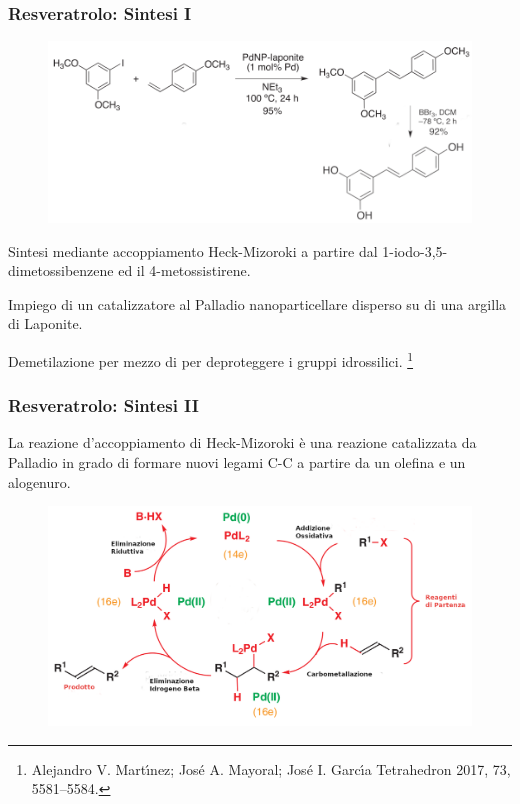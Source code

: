 \documentclass[9pt]{beamer}
\newcommand\blfootnote[1]{%
	\begingroup
	\renewcommand\thefootnote{}\footnote{#1}%
	\addtocounter{footnote}{-1}%
	\endgroup
}
\begin{document}
\begin{frame}
	\frametitle{Resveratrolo: Sintesi I}
	\begin{figure}
		\includegraphics{immagini/totale_resveratrolo.png}
	\end{figure}
	Sintesi mediante accoppiamento Heck-Mizoroki a partire dal 1-iodo-3,5-dimetossibenzene ed il 4-metossistirene.

	Impiego di un catalizzatore al Palladio nanoparticellare disperso su di una argilla di Laponite.

	Demetilazione per mezzo di  per deproteggere i gruppi idrossilici.
	\blfootnote{Alejandro V. Martı́nez; José A. Mayoral; José I. Garcı́a Tetrahedron 2017, 73, 5581–5584.}
\end{frame}

\begin{frame}
	\frametitle{Resveratrolo: Sintesi II}
	\bigskip
	La reazione d'accoppiamento di Heck-Mizoroki è una reazione catalizzata da Palladio in grado di formare nuovi legami C-C a partire da un olefina e un alogenuro.

	\begin{figure}
		\centering
		\includegraphics[width=\textwidth]{immagini/heck.png}
	\end{figure}
\end{frame}
\end{document}

